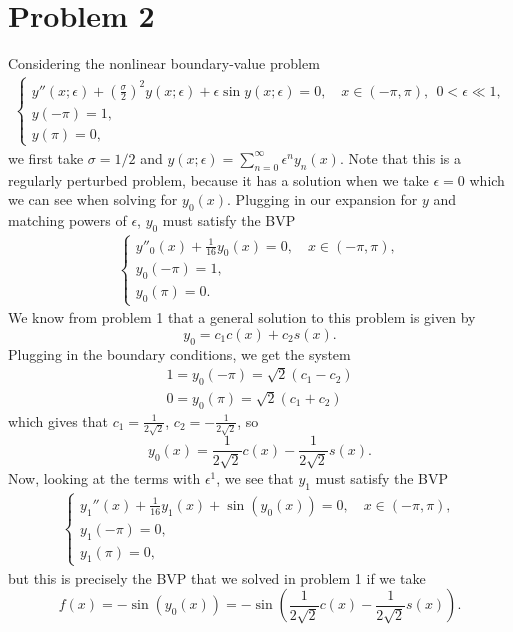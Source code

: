 \documentclass{article}
\begin{document}
\section{Problem 2}
Considering the nonlinear boundary-value problem
  \begin{align*}
    \begin{cases} y''(x;\epsilon) + \left(\frac{\sigma}{2} \right)^2 y(x;\epsilon) + \epsilon \sin y(x;\epsilon) = 0, \quad x \in (-\pi,\pi), ~~ 0 < \epsilon \ll 1,\\
      y(-\pi) = 1,\\
      y(\pi) = 0, \end{cases}
  \end{align*}
we first take $\sigma = 1/2$ and $y(x;\epsilon) = \sum_{n=0}^\infty \epsilon^n y_n(x)$. Note that this is a regularly perturbed problem, because it has a solution when we take $\epsilon=0$ which we can see when solving for $y_0(x)$. Plugging in our expansion for $y$ and matching powers of $\epsilon$, $y_0$ must satisfy the BVP
  \begin{align*}
    \begin{cases} y''_0(x) +  \frac{1}{16} y_0(x) = 0, \quad x \in (-\pi,\pi),\\
      y_0(-\pi) = 1,\\
      y_0(\pi) = 0. \end{cases}
  \end{align*}
We know from problem 1 that a general solution to this problem is given by
\[
y_0=c_1c(x)+c_2s(x).
\]
Plugging in the boundary conditions, we get the system
\begin{align*}
1=y_0(-\pi)=\sqrt{2}(c_1-c_2)\\
0=y_0(\pi)=\sqrt{2}(c_1+c_2)
\end{align*}
which gives that $c_1=\frac{1}{2\sqrt{2}}$, $c_2=-\frac{1}{2\sqrt{2}}$, so
\[
y_0(x)=\frac{1}{2\sqrt{2}}c(x)-\frac{1}{2\sqrt{2}}s(x).
\]
Now, looking at the terms with $\epsilon^1$, we see that $y_1$ must satisfy the BVP 
\begin{align*}
    \begin{cases} y_1''(x) + \frac{1}{16} y_1(x) +\sin(y_0(x))=0, \quad x \in (-\pi,\pi),\\
      y_1(-\pi) = 0,\\
      y_1(\pi) = 0, \end{cases}
  \end{align*}
but this is precisely the BVP that we solved in problem 1 if we take $$f(x)=-\sin(y_0(x))=-\sin\left(\frac{1}{2\sqrt{2}}c(x)-\frac{1}{2\sqrt{2}}s(x)\right).$$
\end{document}
